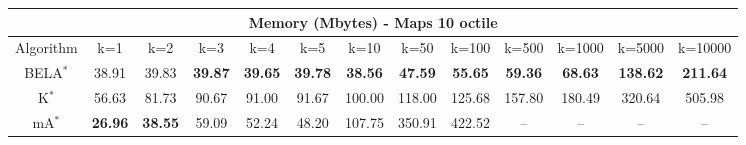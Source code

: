 \begin{tabular}{c|cccccccccccc}\toprule
\multicolumn{13}{c}{Memory (Mbytes) - Maps 10 octile}\\ \midrule
Algorithm & k=1 & k=2 & k=3 & k=4 & k=5 & k=10 & k=50 & k=100 & k=500 & k=1000 & k=5000 & k=10000 \\ \midrule
BELA$^*$ & 38.91 & 39.83 & \textbf{39.87} & \textbf{39.65} & \textbf{39.78} & \textbf{38.56} & \textbf{47.59} & \textbf{55.65} & \textbf{59.36} & \textbf{68.63} & \textbf{138.62} & \textbf{211.64} \\
K$^*$ & 56.63 & 81.73 & 90.67 & 91.00 & 91.67 & 100.00 & 118.00 & 125.68 & 157.80 & 180.49 & 320.64 & 505.98 \\
mA$^*$ & \textbf{26.96} & \textbf{38.55} & 59.09 & 52.24 & 48.20 & 107.75 & 350.91 & 422.52 & -- & -- & -- & -- \\ \bottomrule 
\end{tabular}
